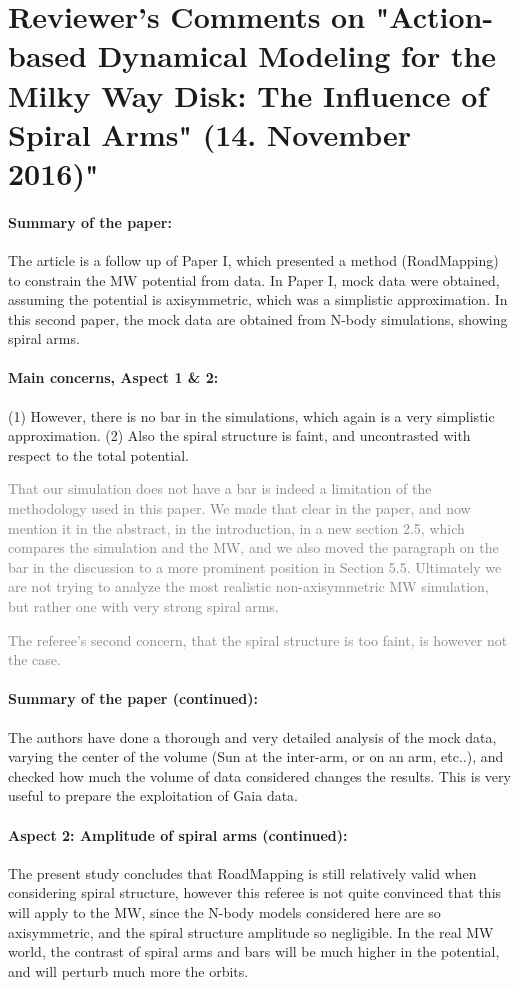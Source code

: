 \documentclass[10pt,a4paper]{article}
\newcommand{\Answer}[1]{\textcolor{Gray}{#1}}
\begin{document}
\section*{Reviewer's Comments on "Action-based Dynamical Modeling for the Milky Way Disk: The Influence of Spiral Arms" (14. November 2016)"}

\paragraph{Summary of the paper:} The article is a follow up of Paper I, which presented a method (RoadMapping) to constrain the MW potential from data. In Paper I, mock data were obtained, assuming
the potential is axisymmetric, which was a simplistic approximation. In this second
paper, the mock data are obtained from N-body simulations, showing spiral arms.

\paragraph{Main concerns, Aspect 1 \& 2:} (1) However, there is no bar in the simulations, which again is a very simplistic approximation.  (2) Also the spiral structure is faint, and uncontrasted with respect to
the total potential.

\Answer{That our simulation does not have a bar is indeed a limitation of the methodology used in this paper. We made that clear in the paper, and now mention it in the abstract, in the introduction, in a new section 2.5, which compares the simulation and the MW, and we also moved the paragraph on the bar in the discussion to a more prominent position in Section 5.5. Ultimately we are not trying to analyze the most realistic non-axisymmetric MW simulation, but rather one with very strong spiral arms.}

\Answer{The referee's second concern, that the spiral structure is too faint, is however not the case.}
 
\paragraph{Summary of the paper (continued):} The authors have done a thorough and very detailed analysis of the mock data, varying the center of the volume (Sun at the inter-arm, or on an arm, etc..), and
checked how much the volume of data considered changes the results. This is very
useful to prepare the exploitation of Gaia data.

\paragraph{Aspect 2: Amplitude of spiral arms (continued):} The present study concludes that RoadMapping is still relatively valid when considering spiral structure, however this referee is not quite convinced that this
will apply to the MW, since the N-body models considered here are so axisymmetric,
and the spiral structure amplitude so negligible. In the real MW world, the contrast
of spiral arms and bars will be much higher in the potential, and will perturb much
more the orbits.  
\end{document}
